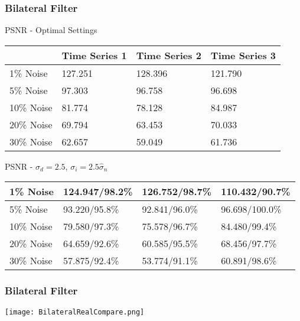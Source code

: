 \documentclass{beamer}
\begin{document}

\begin{frame}
\begin{center}
\frametitle{Bilateral Filter}

\small{

PSNR - Optimal Settings

\begin{table}[h]
\begin{tabular}{l | l | l | l}
 & Time Series 1 & Time Series 2 & Time Series 3 \\ \hline
1\% Noise & 127.251 & 128.396 & 121.790 \\ \hline
5\% Noise & 97.303 & 96.758 & 96.698 \\ \hline
10\% Noise & 81.774 & 78.128 & 84.987 \\ \hline
20\% Noise & 69.794 & 63.453 & 70.033 \\ \hline
30\% Noise & 62.657 & 59.049 & 61.736
\end{tabular}
\end{table}

PSNR - $\sigma_d = 2.5$, $\sigma_i = 2.5 \hat{\sigma}_n$

\begin{table}[h]
\begin{tabular}{l | l | l | l}
1\% Noise & 124.947/98.2\% & 126.752/98.7\% & 110.432/90.7\% \\ \hline
5\% Noise & 93.220/95.8\% & 92.841/96.0\% & 96.698/100.0\% \\ \hline
10\% Noise & 79.580/97.3\% & 75.578/96.7\% & 84.480/99.4\% \\ \hline
20\% Noise & 64.659/92.6\% & 60.585/95.5\% & 68.456/97.7\% \\ \hline
30\% Noise & 57.875/92.4\% & 53.774/91.1\% & 60.891/98.6\%
\end{tabular}
\end{table}

}

\end{center}
\end{frame}


\begin{frame}
\begin{center}
\frametitle{Bilateral Filter}

\texttt{[image: BilateralRealCompare.png]}

\end{center}
\end{frame}
\end{document}
